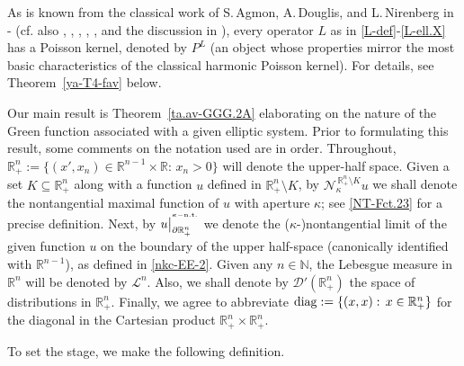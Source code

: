 \documentclass[11pt,reqno]{amsart}
\numberwithin{equation}{section}
\theoremstyle{remark}
\begin{document}
As is known from the classical work of S.\,Agmon, A.\,Douglis, and L.\,Nirenberg in \cite{ADNI}-\cite{ADNII} 
(cf. also \cite{Lop}, \cite{Shap}, \cite{Sol1}, \cite{Sol2}, \cite[\S{10.3}]{KMR2}, and the discussion in \cite[p.\,24]{KM2012}),
every operator $L$ as in \eqref{L-def}-\eqref{L-ell.X} has a Poisson kernel, denoted by $P^L$ 
(an object whose properties mirror the most basic characteristics of the classical harmonic Poisson kernel). 
For details, see Theorem~\ref{ya-T4-fav} below. 

Our main result is Theorem~\ref{ta.av-GGG.2A} elaborating on the nature of the Green function associated 
with a given elliptic system. Prior to formulating this result, some comments on the notation used
are in order. Throughout, ${\mathbb{R}}^n_{+}:=\{(x',x_n)\in{\mathbb{R}}^{n-1}\times{\mathbb{R}}:\,x_n>0\}$ will 
denote the upper-half space. Given a set $K\subseteq{\mathbb{R}}^n_{+}$ along with a function $u$ defined in 
${\mathbb{R}}^n_{+}\setminus K$, by ${\mathcal{N}}^{\,{\mathbb{R}}^n_{+}\setminus K}_\kappa u$ we shall 
denote the nontangential maximal function of $u$ with aperture $\kappa$; see \eqref{NT-Fct.23} for a precise 
definition. Next, by $u\big|^{{}^{\kappa-{\rm n.t.}}}_{\partial{\mathbb{R}}^n_{+}}$ we denote the 
($\kappa$-)nontangential limit of the given function $u$ on the boundary of the upper half-space 
(canonically identified with ${\mathbb{R}}^{n-1}$), as defined in \eqref{nkc-EE-2}. Given any 
$n\in{\mathbb{N}}$, the Lebesgue measure in ${\mathbb{R}}^n$ will be denoted by ${\mathscr{L}}^n$. 
Also, we shall denote by $\mathcal{D}'({\mathbb{R}}^n_{+})$ the space of distributions in ${\mathbb{R}}^n_{+}$.
Finally, we agree to abbreviate ${\rm diag}:=\{(x,x):\,x\in{\mathbb{R}}^n_{+}\}$ for the diagonal in 
the Cartesian product ${\mathbb{R}}^n_{+}\times{\mathbb{R}}^n_{+}$.

To set the stage, we make the following definition.
\end{document}
